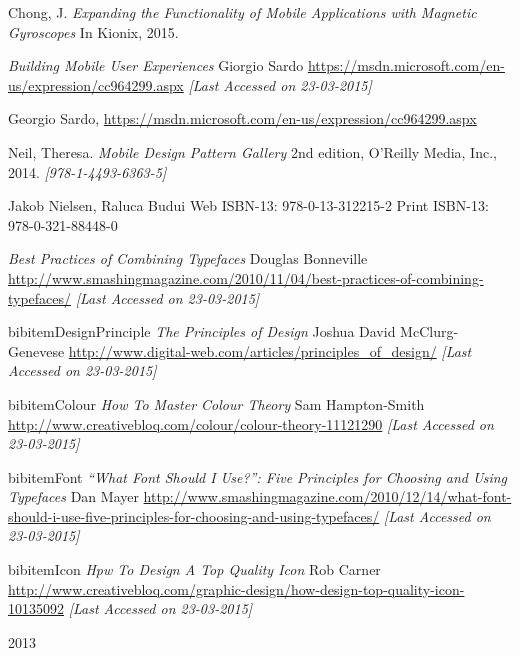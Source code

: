 \begin{thebibliography}{9}

  Chong, J. 
  \textit{Expanding the Functionality of Mobile Applications with Magnetic Gyroscopes} 
  In Kionix,
  2015.
  
	\textit{Building Mobile User Experiences}
	Giorgio Sardo
	\url{https://msdn.microsoft.com/en-us/expression/cc964299.aspx}
	\textit{[Last Accessed on 23-03-2015]}
	
  Georgio Sardo,
  \url{https://msdn.microsoft.com/en-us/expression/cc964299.aspx}
  

	Neil, Theresa.
	\textit{Mobile Design Pattern Gallery}
	2nd edition,
	O'Reilly Media, Inc.,
	2014.
	\textit{[978-1-4493-6363-5]}
		
	Jakob Nielsen, Raluca Budui
	Web ISBN-13: 978-0-13-312215-2
	Print ISBN-13: 978-0-321-88448-0
	
	\textit{Best Practices of Combining Typefaces}
	Douglas Bonneville
	\url{http://www.smashingmagazine.com/2010/11/04/best-practices-of-combining-typefaces/}
	\textit{[Last Accessed on 23-03-2015]}
	
bibitem{DesignPrinciple}
	\textit{The Principles of Design}
	Joshua David McClurg-Genevese
	\url{http://www.digital-web.com/articles/principles_of_design/}
	\textit{[Last Accessed on 23-03-2015]}
	
bibitem{Colour}
	\textit{How To Master Colour Theory}
	Sam Hampton-Smith
	\url{http://www.creativebloq.com/colour/colour-theory-11121290}
	\textit{[Last Accessed on 23-03-2015]}
	
bibitem{Font}
	\textit{“What Font Should I Use?”: Five Principles for Choosing and Using Typefaces}
	Dan Mayer
	\url{http://www.smashingmagazine.com/2010/12/14/what-font-should-i-use-five-principles-for-choosing-and-using-typefaces/}
	\textit{[Last Accessed on 23-03-2015]}
	
bibitem{Icon}
	\textit{Hpw To Design A Top Quality Icon}
	Rob Carner
	\url{http://www.creativebloq.com/graphic-design/how-design-top-quality-icon-10135092}
	\textit{[Last Accessed on 23-03-2015]}
		
	
\end{thebibliography}2013